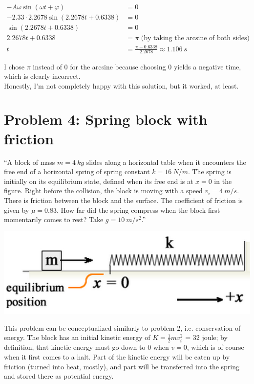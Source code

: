 \documentclass[8.01x]{subfiles}
\begin{document}
\begin{align}
-A \omega \sin(\omega t + \varphi) &= 0\\
-2.33 \cdot 2.2678 \sin(2.2678 t + 0.6338) &= 0\\
\sin(2.2678 t + 0.6338) &= 0\\
2.2678 t + 0.6338 &= \pi \text{ (by taking the arcsine of both sides)}\\
t &= \frac{\pi - 0.6338}{2.2678} \approx \SI{1.106}{s}
\end{align}

I chose $\pi$ instead of 0 for the arcsine because choosing 0 yields a negative time, which is clearly incorrect.\\
Honestly, I'm not completely happy with this solution, but it worked, at least.

\section{Problem 4: Spring block with friction}

``A block of mass $m = \SI{4}{kg}$ slides along a horizontal table when it encounters the free end of a horizontal spring of spring constant $k = \SI{16}{N/m}$. The spring is initially on its equilibrium state, defined when its free end is at $x = 0$ in the figure. Right before the collision, the block is moving with a speed $v_i = \SI{4}{m/s}$. There is friction between the block and the surface. The coefficient of friction is given by $\mu = 0.83$. How far did the spring compress when the block first momentarily comes to rest? Take $g = \SI{10}{m/s^2}$.''

\begin{center}
\includegraphics[scale=0.65]{Graphics/h4p4}
\end{center}

This problem can be conceptualized similarly to problem 2, i.e. conservation of energy. The block has an initial kinetic energy of $K = \frac{1}{2} m v_i^2$ = 32 joule; by definition, that kinetic energy must go down to $0$ when $v = 0$, which is of course when it first comes to a halt. Part of the kinetic energy will be eaten up by friction (turned into heat, mostly), and part will be transferred into the spring and stored there as potential energy.
\end{document}
